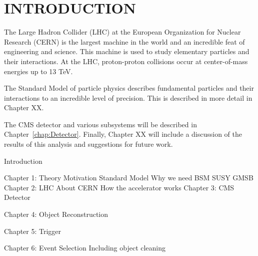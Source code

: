 \chapter{INTRODUCTION}

The Large Hadron Collider (LHC) at the European Organization for Nuclear Research (CERN) is the largest machine in the world and an incredible feat of engineering and science. This machine is used to study elementary particles and their interactions. At the LHC, proton-proton collisions occur at center-of-mass energies up to 13 TeV. 

The Standard Model of particle physics describes fundamental particles and their interactions to an incredible level of precision. This is described in more detail in  Chapter XX. 

The CMS detector and various subsystems will be described in Chapter~\ref{chap:Detector}. Finally, Chapter XX will include a discussion of the results of this analysis and suggestions for future work.

Introduction

Chapter 1: Theory Motivation
	Standard Model
	Why we need BSM
	SUSY
	GMSB
Chapter 2: LHC
	About CERN
	How the accelerator works
Chapter 3: CMS Detector

Chapter 4: Object Reconstruction

Chapter 5: Trigger

Chapter 6: Event Selection
	Including object cleaning
	